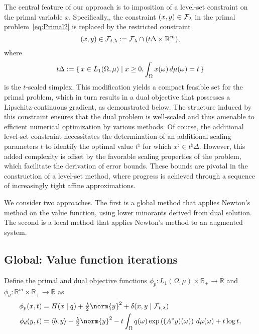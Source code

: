 \documentclass[10pt,a4paper]{article}
\numberwithin{equation}{section}
\theoremstyle{definition}
\def\err{{\overline{\mathbb R}}}
\def\rr{{\mathbb R}}
\def\cF{{\cal F}}
\newcommand{\ip}[1]{\langle#1\rangle}
\begin{document}
The central feature of our approach is to imposition of a level-set constraint on the primal variable $x$. Specifically,, the constraint $(x,y)\in\cF_\lambda$ in the primal problem~\eqref{eq:Primal2} is replaced by the restricted constraint
\begin{equation}\label{eq:level-set}
    (x,y)\in \cF_{t,\lambda}:=\cF_\lambda \cap (t\Delta\times\rr^m),
\end{equation}
where $$t\Delta:=\set{x\in L_1( \Omega, \mu) | x\ge0, \int_\Omega x(\omega)\,d\mu(\omega)=t}$$ is the $t$-scaled simplex. This modification yields a compact feasible set for the primal problem, which in turn results in a dual objective that possesses a Lipschitz-continuous gradient, as demonstrated below. The structure induced by this constraint ensures that the dual problem is well-scaled and thus amenable to efficient numerical optimization by various methods. Of course, the additional level-set constraint necessitates the determination of an additional scaling parameters $t$ to identify the optimal value $t^\natural$ for which $x^\natural\in t^\natural\Delta$. However, this added complexity is offset by the favorable scaling properties of the problem, which facilitate the derivation of error bounds. These bounds are pivotal in the construction of a level-set method, where progress is achieved through a sequence of increasingly tight affine approximations.


We consider two approaches. The first is a global method that applies Newton's method on the value function, using lower minorants derived from dual solution. The second is a local method that applies Newton's method to an augmented system.

\subsection{Global: Value function iterations}

Define the primal and dual objective functions $\phi_p: L_1(\Omega,\mu)\times\rr_+\to\err$ and $\phi_d:\rr^m\times\rr_+\to\rr$ as 
\begin{subequations}\label{eq:primal-dual-objectives}
\begin{align}\label{eq:primal-objective}
    \phi_p(x,t) &= H(x \mid q) + \tfrac{\lambda}{2}\norm{y}^2 + \delta(x,y\mid \cF_{t,\lambda})\\
    \phi_d(y,t) &= \ip{b,y} - \tfrac{\lambda}{2}\norm{y}^2 - t\int_\Omega q(\omega)\exp\left((A^*y)(\omega)\right) \,d\mu(\omega) + t\log t,
\end{align}
\end{subequations}
\end{document}
